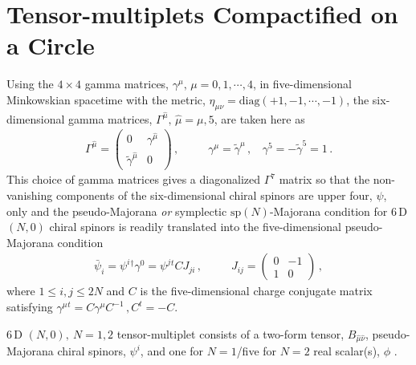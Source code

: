 \documentclass[a4paper,12pt]{article}
\begin{document}
\section{Tensor-multiplets Compactified on a Circle\label{compact}}
Using  the $4\times 4$  gamma matrices, 
$\gamma^{\mu},\,\mu=0,1,\cdots,4$, in five-dimensional Minkowskian spacetime with the metric, $\eta_{\mu\nu}=\mbox{diag}(+1,-1,\cdots,-1)$,   the  six-dimensional gamma matrices, $\Gamma^{\hat{\mu}},\,\hat{\mu}=\mu,5$, are taken here as
\begin{equation}
\begin{array}{ccc}
\Gamma^{\hat{\mu}}=\left(\begin{array}{ll}
0&\gamma^{\hat{\mu}}\\
\tilde{\gamma}^{\hat{\mu}}&0
\end{array}\right)\,,~~~~&~~~~\gamma^{\mu}=\tilde{\gamma}^{\mu}\,,~~~~\gamma^{5}=-\tilde{\gamma}^{5}=1\,.
\end{array}
\end{equation}
This choice of gamma matrices gives a diagonalized  $\Gamma^{7}$ matrix  so that the non-vanishing components of the  six-dimensional chiral spinors are upper four, $\psi$, only  and  the pseudo-Majorana \textit{or} symplectic $\mbox{sp}(N)$-Majorana condition for $6$\,D  $(N,0)$ chiral spinors is readily translated into the 
five-dimensional   pseudo-Majorana  condition~\cite{kugotownsend} 
\begin{equation}
\begin{array}{cc}
\bar{\psi}_{i}=\psi^{i}{}^{\dagger}\gamma^{0}=\psi^{j}{}^{t}CJ_{ji}\,,~~~~&~~~~
J_{ij}=\left(\begin{array}{cr}
0&-1\\
1&0
\end{array}\right)\,,
\end{array}
\label{PM}
\end{equation}
where $1\leq i,j\leq 2N$ and $C$ is the five-dimensional charge conjugate matrix satisfying $\gamma^{\mu}{}^{t}=C\gamma^{\mu}C^{-1}\,,C^{t}=-C$. \newline


$6\,$D $(N,0),~N=1,2$ tensor-multiplet consists of a two-form tensor, $B_{\hat{\mu}\hat{\nu}}$,  pseudo-Majorana chiral spinors, $\psi^{i}$, and  one  for $N=1$/five  for $N=2$ real scalar(s), $\phi$ \cite{NPB221331}.  \newline
\end{document}
